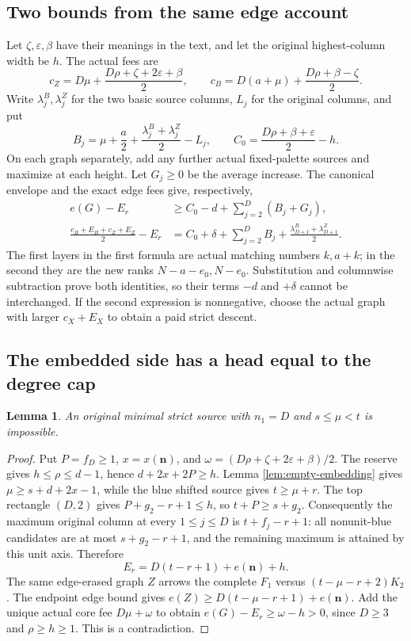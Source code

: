 \documentclass[11pt,a4paper]{article}
\newcommand{\nn}{\mathbf n}\newcommand{\mm}{\mathbf m}
\newtheorem{lemma}[theorem]{Lemma}
\theoremstyle{definition}
\begin{document}
\subsection{Two bounds from the same edge account}
Let $\zeta,\varepsilon,\beta$ have their meanings in the text, and let the original highest-column width be $h$. The actual fees are
\[
c_Z=D\mu+\frac{D\rho+\zeta+2\varepsilon+\beta}{2},\qquad
c_B=D(a+\mu)+\frac{D\rho+\beta-\zeta}{2}.
\]
Write $\lambda_j^B,\lambda_j^Z$ for the two basic source columns, $L_j$ for the original columns, and put
\[
B_j=\mu+\frac a2+\frac{\lambda_j^B+\lambda_j^Z}{2}-L_j,
\qquad C_0=\frac{D\rho+\beta+\varepsilon}{2}-h.
\]
On each graph separately, add any further actual fixed-palette sources and maximize at each height. Let $G_j\ge0$ be the average increase. The canonical envelope and the exact edge fees give, respectively,
\begin{align}
e(G)-E_r&\ge C_0-d+\sum_{j=2}^D(B_j+G_j),\label{eq:two-ledger-potential}\\
\frac{c_B+E_B+c_Z+E_Z}{2}-E_r
&=C_0+\delta+\sum_{j=2}^DB_j+\frac{\lambda_{D+1}^B+\lambda_{D+1}^Z}{2}.
\label{eq:two-ledger-area}
\end{align}
The first layers in the first formula are actual matching numbers $k,a+k$; in the second they are the new ranks $N-a-e_0,N-e_0$. Substitution and columnwise subtraction prove both identities, so their terms $-d$ and $+\delta$ cannot be interchanged. If the second expression is nonnegative, choose the actual graph with larger $c_X+E_X$ to obtain a paid strict descent.

\subsection{The embedded side has a head equal to the degree cap}
\begin{lemma}\label{lem:reverse-owncap}
An original minimal strict source with $n_1=D$ and $s\le\mu<t$ is impossible.
\end{lemma}
\begin{proof}
Put $P=f_D\ge1$, $x=x(\nn)$, and $\omega=(D\rho+\zeta+2\varepsilon+\beta)/2$. The reserve gives $h\le\rho\le d-1$, hence $d+2x+2P\ge h$. Lemma \ref{lem:empty-embedding} gives $\mu\ge s+d+2x-1$, while the blue shifted source gives $t\ge\mu+r$. The top rectangle $(D,2)$ gives $P+g_2-r+1\le h$, so $t+P\ge s+g_2$. Consequently the maximum original column at every $1\le j\le D$ is $t+f_j-r+1$: all nonunit-blue candidates are at most $s+g_2-r+1$, and the remaining maximum is attained by this unit axis. Therefore
\[
E_r=D(t-r+1)+e(\nn)+h.
\]
The same edge-erased graph $Z$ arrows the complete $F_1$ versus $(t-\mu-r+2)K_2$. The endpoint edge bound gives $e(Z)\ge D(t-\mu-r+1)+e(\nn)$. Add the unique actual core fee $D\mu+\omega$ to obtain $e(G)-E_r\ge\omega-h>0$, since $D\ge3$ and $\rho\ge h\ge1$. This is a contradiction.
\end{proof}
\end{document}

